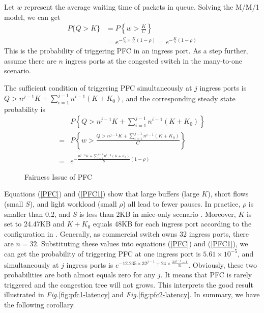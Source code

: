 \documentclass[]{sig-alternate-10pt}
\begin{document}
Let $w$ represent the average waiting time of packets in queue. Solving the M/M/1 model, we can get
\begin{equation}
\label{PFC}
\begin{array}{cl}
P\{Q>K\}&=P\left\{w>\frac{K}{C}\right\} \\[5pt]
&=e^{-\frac{C}{S}\times\frac{K}{C}(1-\rho)}=e^{-\frac{K}{S}(1-\rho)}
\end{array}
\end{equation}
This is the probability of triggering PFC in an ingress port.
As a step further, assume there are $n$ ingress ports at the congested switch in the many-to-one scenario.

The sufficient condition of triggering PFC simultaneously at $j$ ingress ports is
$Q>n^{j-1}K+\sum \limits_{i=1}^{j-1}n^{i-1}(K+K_0)$, and the corresponding steady state probability is
\begin{equation}
\label{PFC1}
\begin{array}{cl}
	& P\left\{Q>n^{j-1}K+\sum_{i=1}^{j-1}n^{i-1}(K+K_0)\right\} \\[5pt]
	=& P\left\{w>\frac{Q>n^{j-1}K+\sum_{i=1}^{j-1}n^{i-1}(K+K_0)}{C}\right\} \\[5pt]
	=& e^{-\frac{n^{j-1}K+\sum_{i=1}^{j-1}n^{i-1}(K+K_0)}{S}(1-\rho)}
\end{array}
\end{equation}
\begin{figure}[t]
	\centering
	\hfill
	\caption{Fairness Issue of PFC}
	\label{fig:pfc2}
\end{figure}
Equations (\ref{PFC}) and (\ref{PFC1}) show that large buffers (large $K$), short flows (small $S$), and light workload (small $\rho$) all lead to fewer pauses. In practice, $\rho$ is smaller than 0.2, and $S$ is less than 2KB in mice-only scenario \cite{vamanan2012deadline}. Moreover, $K$ is set to 24.47KB and $K+K_0$ equals 48KB for each ingress port according to the configuration in \cite{zhu2015congestion}. Generally, as commercial switch owns 32 ingress ports, there are $n=32$. Substituting these values into equations (\ref{PFC}) and (\ref{PFC1}), we can get the probability of triggering PFC at one ingress port is $5.61\times10^{-5}$, and simultaneously at $j$ ingress ports is $e^{-12.235\times32^{j-1}+24\times\frac{32^{j-1}-1}{31}}$. Obviously, these two probabilities are both almost equals zero for any $j$. It means that PFC is rarely triggered and the congestion tree will not grows.
This interprets the good result illustrated in \emph{Fig.}\ref{fig:pfc1-latency} and \emph{Fig.}\ref{fig:pfc2-latency}.
In summary, we have the following corollary.
\end{document}
